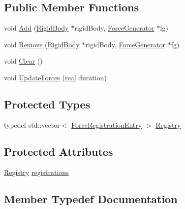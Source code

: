 \subsection*{Public Member Functions}
\begin{DoxyCompactItemize}
\item 
void \hyperlink{classrum_1_1_force_registry_a3062f9ea0518bdef2624b39e17eb95d4}{Add} (\hyperlink{classrum_1_1_rigid_body}{Rigid\+Body} $\ast$rigid\+Body, \hyperlink{classrum_1_1_force_generator}{Force\+Generator} $\ast$fg)
\item 
void \hyperlink{classrum_1_1_force_registry_a26782e5d963910c3b61b27362591ba36}{Remove} (\hyperlink{classrum_1_1_rigid_body}{Rigid\+Body} $\ast$rigid\+Body, \hyperlink{classrum_1_1_force_generator}{Force\+Generator} $\ast$fg)
\item 
void \hyperlink{classrum_1_1_force_registry_a571da7ffd245ae2b09dd5538881a19de}{Clear} ()
\item 
void \hyperlink{classrum_1_1_force_registry_a162fdd23949e8c99523257a551c41e7c}{Update\+Forces} (\hyperlink{namespacerum_a7e8cca23573d5eaead0f138cbaa4862c}{real} duration)
\end{DoxyCompactItemize}
\subsection*{Protected Types}
\begin{DoxyCompactItemize}
\item 
typedef std\+::vector$<$ \hyperlink{structrum_1_1_force_registry_1_1_force_registration_entry}{Force\+Registration\+Entry} $>$ \hyperlink{classrum_1_1_force_registry_a9523605286e7ef4f693c3c485df757a6}{Registry}
\end{DoxyCompactItemize}
\subsection*{Protected Attributes}
\begin{DoxyCompactItemize}
\item 
\hyperlink{classrum_1_1_force_registry_a9523605286e7ef4f693c3c485df757a6}{Registry} \hyperlink{classrum_1_1_force_registry_a6b37ba6705d19a996324d1d10d642041}{registrations}
\end{DoxyCompactItemize}


\subsection{Member Typedef Documentation}
\mbox{\label{classrum_1_1_force_registry_a9523605286e7ef4f693c3c485df757a6}} 
